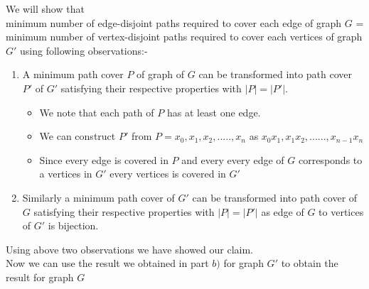 \documentclass{report}
\begin{document}
 We will show that\\ minimum number of edge-disjoint  paths required to cover each edge  of graph $G$ = minimum number of vertex-disjoint paths required to cover each vertices of graph $G'$ using following observations:-
 \begin{enumerate}\item
 A minimum path cover $P$ of graph of $G$ can be transformed into path cover $P'$ of $G'$ satisfying their respective properties with $|P| = |P'|$.\\
 \begin{itemize}
     \item 
 
 We note that each path of $P$ has at least one edge.
 \item
 We can  construct $P'$ from $P = x_0,x_1,x_2,.....,x_n$ as $x_0x_1, x_1x_2,......,x_{n-1}x_n$ 
 \item
 Since every edge is covered in $P$ and every every edge of $G$ corresponds to a vertices in $G'$ every vertices is covered in $G'$
 \end{itemize}
 \item
 Similarly a minimum  path cover of $G'$ can be transformed into path cover of $G$ satisfying their respective properties with $|P| = |P'|$ as edge of $G$ to vertices of $G'$ is bijection.
 \end{enumerate}
 
 Using above two observations we have showed our claim.\\
 Now we can use  the result we obtained in part $b)$ for graph $G'$ to obtain the result for graph $G$
\end{document}
